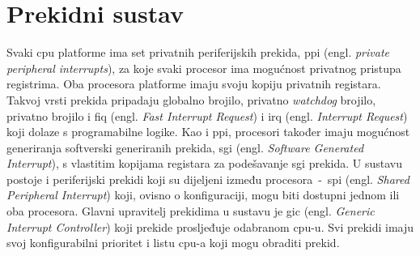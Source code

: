 \documentclass[times, utf8, diplomski, numeric]{fer}
\begin{document}
\section{Prekidni sustav}
Svaki \gls{cpu} platforme ima set privatnih periferijskih prekida, \gls{ppi} (engl. \textit{private peripheral interrupts}),
za koje svaki procesor ima mogućnost privatnog pristupa registrima. Oba procesora platforme imaju svoju kopiju privatnih
registara.
Takvoj vrsti prekida pripadaju globalno brojilo, privatno \textit{watchdog} brojilo, privatno brojilo i \gls{fiq} (engl.
\textit{Fast Interrupt Request}) i \gls{irq} (engl. \textit{Interrupt Request}) koji dolaze s programabilne logike.
Kao i \gls{ppi}, procesori također imaju mogućnost generiranja softverski generiranih prekida, \gls{sgi} (engl. \textit{Software
Generated Interrupt}), s vlastitim kopijama registara za podešavanje \gls{sgi} prekida. U sustavu postoje i periferijski prekidi
koji su dijeljeni između procesora~-~\gls{spi} (engl. \textit{Shared Peripheral Interrupt}) koji, ovisno o konfiguraciji,
mogu biti dostupni jednom ili oba procesora. Glavni upravitelj prekidima u sustavu je \gls{gic} (engl. \textit{Generic
Interrupt Controller}) koji prekide prosljeđuje odabranom \gls{cpu}-u. Svi prekidi imaju svoj konfigurabilni prioritet
i listu \gls{cpu}-a koji mogu obraditi prekid.
\end{document}
